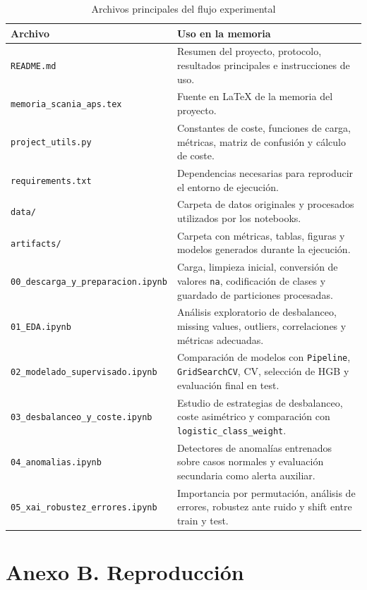 \documentclass[11pt,a4paper]{article}
\begin{document}
\begin{table}[H]
\centering
\caption{Archivos principales del flujo experimental}
\small
\begin{tabular}{@{}p{}p{}@{}}
\toprule
\textbf{Archivo} & \textbf{Uso en la memoria}\\
\midrule
\texttt{README.md} & Resumen del proyecto, protocolo, resultados principales e instrucciones de uso.\\
\texttt{memoria\_scania\_aps.tex} & Fuente en LaTeX de la memoria del proyecto.\\
\texttt{project\_utils.py} & Constantes de coste, funciones de carga, métricas, matriz de confusión y cálculo de coste.\\
\texttt{requirements.txt} & Dependencias necesarias para reproducir el entorno de ejecución.\\
\texttt{data/} & Carpeta de datos originales y procesados utilizados por los notebooks.\\
\texttt{artifacts/} & Carpeta con métricas, tablas, figuras y modelos generados durante la ejecución.\\
\texttt{00\_descarga\_y\_preparacion.ipynb} & Carga, limpieza inicial, conversión de valores \texttt{na}, codificación de clases y guardado de particiones procesadas.\\
\texttt{01\_EDA.ipynb} & Análisis exploratorio de desbalanceo, missing values, outliers, correlaciones y métricas adecuadas.\\
\texttt{02\_modelado\_supervisado.ipynb} & Comparación de modelos con \texttt{Pipeline}, \texttt{GridSearchCV}, CV, selección de HGB y evaluación final en test.\\
\texttt{03\_desbalanceo\_y\_coste.ipynb} & Estudio de estrategias de desbalanceo, coste asimétrico y comparación con \texttt{logistic\_class\_weight}.\\
\texttt{04\_anomalias.ipynb} & Detectores de anomalías entrenados sobre casos normales y evaluación secundaria como alerta auxiliar.\\
\texttt{05\_xai\_robustez\_errores.ipynb} & Importancia por permutación, análisis de errores, robustez ante ruido y shift entre train y test.\\
\bottomrule
\end{tabular}
\end{table}


\section{Anexo B. Reproducción}
\label{anexo_reproduccion}
\end{document}

